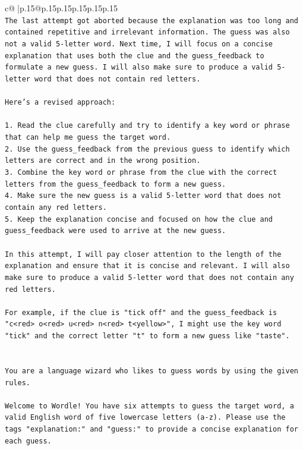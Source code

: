 \documentclass{article}
\begin{document}
{\begin{supertabular}{c@{$\;$}|p{.15\linewidth}@{}p{.15\linewidth}p{.15\linewidth}p{.15\linewidth}p{.15\linewidth}p{.15\linewidth}}
{{{\\ 
\texttt{The last attempt got aborted because the explanation was too long and contained repetitive and irrelevant information. The guess was also not a valid 5{-}letter word. Next time, I will focus on a concise explanation that uses both the clue and the guess\_feedback to formulate a new guess. I will also make sure to produce a valid 5{-}letter word that does not contain red letters. } \\
\\ 
\texttt{Here's a revised approach:} \\
\\ 
\texttt{1. Read the clue carefully and try to identify a key word or phrase that can help me guess the target word.} \\
\texttt{2. Use the guess\_feedback from the previous guess to identify which letters are correct and in the wrong position.} \\
\texttt{3. Combine the key word or phrase from the clue with the correct letters from the guess\_feedback to form a new guess.} \\
\texttt{4. Make sure the new guess is a valid 5{-}letter word that does not contain any red letters.} \\
\texttt{5. Keep the explanation concise and focused on how the clue and guess\_feedback were used to arrive at the new guess.} \\
\\ 
\texttt{In this attempt, I will pay closer attention to the length of the explanation and ensure that it is concise and relevant. I will also make sure to produce a valid 5{-}letter word that does not contain any red letters. } \\
\\ 
\texttt{For example, if the clue is "tick off" and the guess\_feedback is "c<red> o<red> u<red> n<red> t<yellow>", I might use the key word "tick" and the correct letter "t" to form a new guess like "taste".} \\
\\ 
\\ 
\texttt{You are a language wizard who likes to guess words by using the given rules.} \\
\\ 
\texttt{Welcome to Wordle! You have six attempts to guess the target word, a valid English word of five lowercase letters (a{-}z). Please use the tags "explanation:" and "guess:" to provide a concise explanation for each guess.} \\
}}}
\end{supertabular}}
\end{document}
